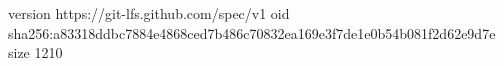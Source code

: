 version https://git-lfs.github.com/spec/v1
oid sha256:a83318ddbc7884e4868ced7b486c70832ea169e3f7de1e0b54b081f2d62e9d7e
size 1210
